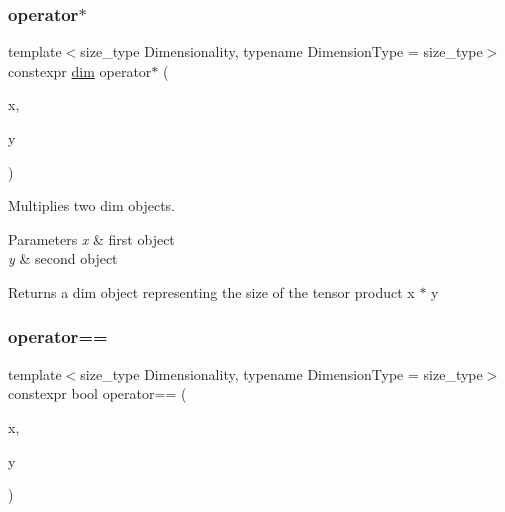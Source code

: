 \subsubsection{\texorpdfstring{operator$\ast$}{operator*}}
{\footnotesize\ttfamily template$<$size\+\_\+type Dimensionality, typename Dimension\+Type = size\+\_\+type$>$ \\
constexpr \hyperlink{structgko_1_1dim}{dim} operator$\ast$ (\begin{DoxyParamCaption}\item[{const \hyperlink{structgko_1_1dim}{dim}$<$ Dimensionality, Dimension\+Type $>$ \&}]{x,  }\item[{const \hyperlink{structgko_1_1dim}{dim}$<$ Dimensionality, Dimension\+Type $>$ \&}]{y }\end{DoxyParamCaption})\hspace{0.3cm}{\ttfamily [friend]}}



Multiplies two dim objects. 


\begin{DoxyParams}{Parameters}
{\em x} & first object \\
\hline
{\em y} & second object\\
\hline
\end{DoxyParams}
\begin{DoxyReturn}{Returns}
a dim object representing the size of the tensor product {\ttfamily x $\ast$ y} 
\end{DoxyReturn}
\mbox{\label{structgko_1_1dim_a5e2c1e99f1c12540aac8489127c5dfb6}} 
\subsubsection{\texorpdfstring{operator==}{operator==}}
{\footnotesize\ttfamily template$<$size\+\_\+type Dimensionality, typename Dimension\+Type = size\+\_\+type$>$ \\
constexpr bool operator== (\begin{DoxyParamCaption}\item[{const \hyperlink{structgko_1_1dim}{dim}$<$ Dimensionality, Dimension\+Type $>$ \&}]{x,  }\item[{const \hyperlink{structgko_1_1dim}{dim}$<$ Dimensionality, Dimension\+Type $>$ \&}]{y }\end{DoxyParamCaption})\hspace{0.3cm}{\ttfamily [friend]}}



